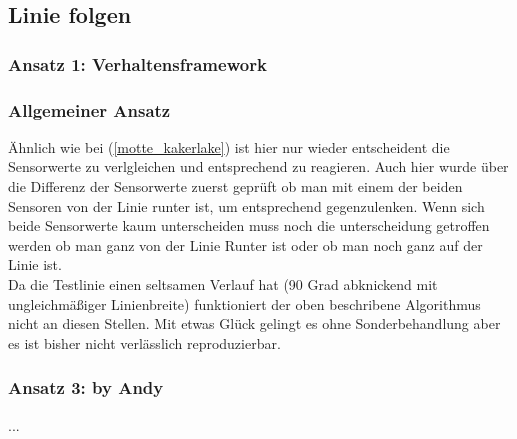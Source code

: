 \subsection{Linie folgen}
\label{linie_folgen}

\subsubsection{Ansatz 1: Verhaltensframework}

\subsubsection{Allgemeiner Ansatz}

Ähnlich wie bei  (\ref{motte_kakerlake})  ist hier nur wieder entscheident die Sensorwerte zu verlgleichen und entsprechend zu reagieren. Auch hier wurde über die Differenz der Sensorwerte zuerst geprüft ob man mit einem der beiden Sensoren von der Linie runter ist, um entsprechend gegenzulenken. Wenn sich beide Sensorwerte kaum unterscheiden muss noch die unterscheidung getroffen werden ob man ganz von der Linie Runter ist oder ob man noch ganz auf der Linie ist.
\\
Da die Testlinie einen seltsamen Verlauf hat (90 Grad abknickend mit ungleichmäßiger Linienbreite) funktioniert der oben beschribene Algorithmus nicht an diesen Stellen. Mit etwas Glück gelingt es ohne Sonderbehandlung aber es ist bisher nicht verlässlich reproduzierbar.


\subsubsection{Ansatz 3: by Andy}
...
